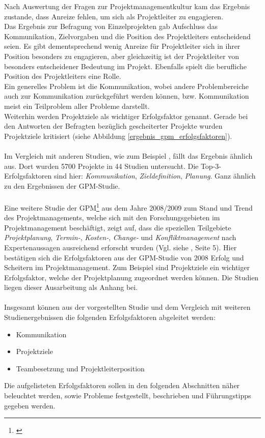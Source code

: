 \documentclass[12pt]{scrartcl}
\begin{document}
Nach Auswertung der Fragen zur Projektmanagementkultur kam das Ergebnis zustande, dass Anreize fehlen, um sich als Projektleiter zu engagieren. \\
Das Ergebnis zur Befragung von Einzelprojekten gab Aufschluss das Kommunikation, Zielvorgaben und die Position des Projektleiters entscheidend seien. Es gibt dementsprechend wenig Anreize für Projektleiter sich in ihrer Position besonders zu engagieren, aber gleichzeitig ist der Projektleiter von besonders entscheidener Bedeutung im Projekt. Ebenfalls spielt die berufliche Position des Projektleiters eine Rolle.\\
Ein generelles Problem ist die Kommunikation, wobei andere Problembereiche auch zur Kommunikation zurückgeführt werden können, bzw. Kommunikation meist ein Teilproblem aller Probleme darstellt.\\
Weiterhin werden Projektziele als wichtiger Erfolgsfaktor genannt. Gerade bei den Antworten der Befragten bezüglich gescheiterter Projekte wurden Projektziele kritisiert  (siehe Abbildung \ref{ergebnis_gpm_erfolgsfaktoren}).\\
\\
Im Vergleich mit anderen Studien, wie zum Beispiel \cite{euregio__studie_erfolgsfaktoren}, fällt das Ergebnis ähnlich aus. Dort wurden 5700 Projekte in 44 Studien untersucht. Die Top-3-Erfolgsfaktoren sind hier: \textit{Kommunikation}, \textit{Zieldefinition}, \textit{Planung}. Ganz ähnlich zu den Ergebnissen der GPM-Studie.\\
\\
Eine weitere Studie der GPM\footnote{\cite{gpm_gesamt_07_09}} aus dem Jahre 2008/2009 zum Stand und Trend des Projektmanagements, welche sich mit den Forschungsgebieten im Projektmanagement beschäftigt, zeigt auf, dass die speziellen Teilgebiete \textit{Projektplanung}, \textit{Termin-}, \textit{Kosten-}, \textit{Change-} und \textit{Konfliktmanagement} nach Expertenaussagen ausreichend erforscht wurden (Vgl. siehe \cite{gpm_gesamt_07_09}, Seite 5). Hier bestätigen sich die Erfolgsfaktoren aus der GPM-Studie von 2008 Erfolg und Scheitern im Projektmanagement. Zum Beispiel sind Projektziele ein wichtiger Erfolgsfaktor, welche der Projektplanung zugeordnet werden können. Die Studien liegen dieser Ausarbeitung als Anhang bei. \\
\\
Insgesamt können aus der vorgestellten Studie und dem Vergleich mit weiteren Studienergebnissen die folgenden Erfolgsfaktoren abgeleitet werden:
\begin{itemize}
    \item{Kommunikation}
    \item{Projektziele}
    \item{Teambesetzung und Projektleiterposition}
\end{itemize}
Die aufgelisteten Erfolgsfaktoren sollen in den folgenden Abschnitten näher beleuchtet werden, sowie Probleme festgestellt, beschrieben und Führungstipps gegeben werden.
\end{document}
